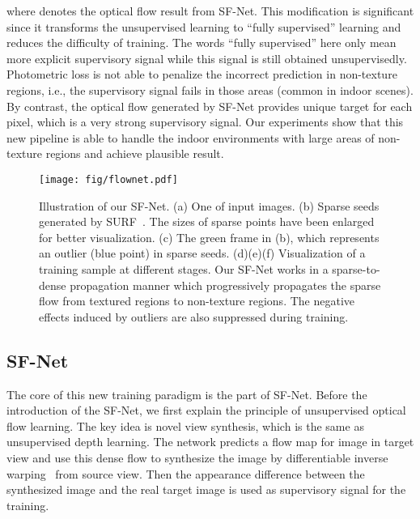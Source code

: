 \documentclass[10pt,twocolumn,letterpaper]{article}
\begin{document}
where  denotes the optical flow result from SF-Net. This modification is significant since it transforms the unsupervised learning to ``fully supervised'' learning and reduces the difficulty of training. The words ``fully supervised'' here only mean more explicit supervisory signal while this signal is still obtained unsupervisedly. Photometric loss is not able to penalize the incorrect prediction in non-texture regions, i.e., the supervisory signal fails in those areas (common in indoor scenes). By contrast, the optical flow generated by SF-Net provides unique target for each pixel, which is a very strong supervisory signal. Our experiments show that this new pipeline is able to handle the indoor environments with large areas of non-texture regions and achieve plausible result.

\begin{figure}
\begin{center}
  \texttt{[image: fig/flownet.pdf]}
\end{center}
   \vspace{-3mm}
   \caption{Illustration of our SF-Net. (a) One of input images. (b) Sparse seeds generated by SURF~\cite{bay2006surf}. The sizes of sparse points have been enlarged for better visualization. (c) The green frame in (b), which represents an outlier (blue point) in sparse seeds. (d)(e)(f) Visualization of a training sample at different stages. Our SF-Net works in a sparse-to-dense propagation manner which progressively propagates the sparse flow from textured regions to non-texture regions. The negative effects induced by outliers are also suppressed during training.}
\label{fig:flownet}
\vspace{-5mm}
\end{figure}

\subsection{SF-Net}

The core of this new training paradigm is the part of SF-Net. Before the introduction of the SF-Net, we first explain the principle of unsupervised optical flow learning. The key idea is novel view synthesis, which is the same as unsupervised depth learning. The network predicts a flow map for image  in target view and use this dense flow to synthesize the image  by differentiable inverse warping~\cite{jaderberg2015spatial} from source view. Then the appearance difference between the synthesized image  and the real target image  is used as supervisory signal for the training. 
\end{document}
